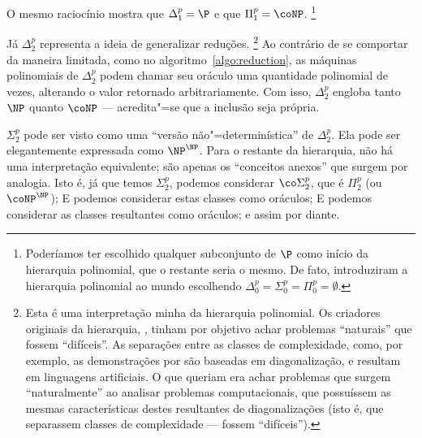 O mesmo raciocínio mostra que $\Delta_1^p = \P$
e que $\Pi_1^p = \coNP$.%
\footnote{
    Poderíamos ter escolhido qualquer subconjunto de $\P$
    como início da hierarquia polinomial,
    que o restante seria o mesmo.
    De fato, 
    introduziram a hierarquia polinomial ao mundo
    escolhendo $\Delta_0^p = \Sigma_0^p = \Pi_0^p = \emptyset$.
}

Já $\Delta_2^p$ representa a ideia de generalizar reduções.%
\footnote{
    Esta é uma interpretação minha da hierarquia polinomial.
    Os criadores originais da hierarquia,
    ,
    tinham por objetivo achar problemas ``naturais''
    que fossem ``difíceis''.
    As separações entre as classes de complexidade,
    como, por exemplo, as demonstrações por 
    são baseadas em diagonalização,
    e resultam em linguagens artificiais.
    O que  queriam
    era achar problemas que surgem ``naturalmente''
    ao analisar problemas computacionais,
    que possuíssem as mesmas características
    destes resultantes de diagonalizações
    (isto é, que separassem classes de complexidade
    --- fossem ``difíceis'').
}
Ao contrário de se comportar da maneira limitada,
como no algoritmo~\ref{algo:reduction},
as máquinas polinomiais de $\Delta_2^p$
podem chamar seu oráculo uma quantidade polinomial de vezes,
alterando o valor retornado arbitrariamente.
Com isso, $\Delta_2^p$ engloba tanto $\NP$ quanto $\coNP$
--- acredita"=se que a inclusão seja própria.

$\Sigma_2^p$ pode ser visto como uma ``versão não"=determinística'' de $\Delta_2^p$.
Ela pode ser elegantemente expressada como $\NP^\NP$.
Para o restante da hierarquia,
não há uma interpretação equivalente;
são apenas os ``conceitos anexos'' que surgem por analogia.
Isto é, já que temos $\Sigma_2^p$,
podemos considerar $\co \Sigma_2^p$, que é $\Pi_2^p$
(ou $\coNP^\NP$);
E podemos considerar estas classes como oráculos;
E podemos considerar as classes resultantes como oráculos;
e assim por diante.

